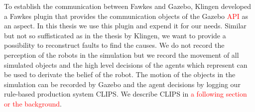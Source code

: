 To establish the communication between Fawkes and Gazebo, Klingen developed a Fawkes plugin that provides the communication objects of the Gazebo \textcolor{red}{API} as an aspect. In this thesis we use this plugin and expend it for our needs. Similar but not so suffisticated as in the thesis by Klingen, we want to provide a possibility to reconstruct faults to find the causes. We do not record the perception of the robots in the simulation but we record the movement of all simulated objects and the high level decisions of the agents which represent can be used to derivate the belief of the robot. The motion of the objects in the simulation can be recorded by Gazebo and the agent decisions by logging our rule-based production system CLIPS. We describe CLIPS in \textcolor{red}{a following section or the background}.

